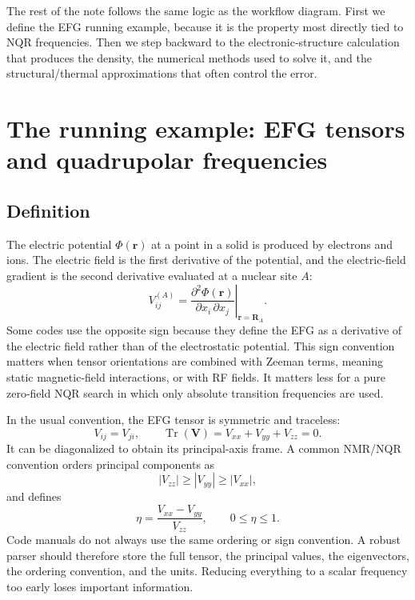 \documentclass[11pt]{article}
\newcommand{\etaEFG}{\eta}
\newcommand{\Tr}{\operatorname{Tr}}
\begin{document}
The rest of the note follows the same logic as the workflow diagram.  First we define the EFG running example, because it is the property most directly tied to NQR frequencies.  Then we step backward to the electronic-structure calculation that produces the density, the numerical methods used to solve it, and the structural/thermal approximations that often control the error.

\section{The running example: EFG tensors and quadrupolar frequencies}

\subsection{Definition}

The electric potential $\Phi(\mathbf r)$ at a point in a solid is produced by electrons and ions.  The electric field is the first derivative of the potential, and the electric-field gradient is the second derivative evaluated at a nuclear site $A$:
\begin{equation}
V_{ij}^{(A)} = \left.\frac{\partial^2 \Phi(\mathbf r)}{\partial x_i\,\partial x_j}\right|_{\mathbf r=\mathbf R_A}.
\label{eq:efgdef}
\end{equation}
Some codes use the opposite sign because they define the EFG as a derivative of the electric field rather than of the electrostatic potential.  This sign convention matters when tensor orientations are combined with Zeeman terms, meaning static magnetic-field interactions, or with RF fields.  It matters less for a pure zero-field NQR search in which only absolute transition frequencies are used.

In the usual convention, the EFG tensor is symmetric and traceless:
\begin{equation}
V_{ij}=V_{ji}, \qquad \Tr(\mathbf V)=V_{xx}+V_{yy}+V_{zz}=0.
\end{equation}
It can be diagonalized to obtain its principal-axis frame.  A common NMR/NQR convention orders principal components as
\begin{equation}
|V_{zz}| \ge |V_{yy}| \ge |V_{xx}|,
\end{equation}
and defines
\begin{equation}
\etaEFG = \frac{V_{xx}-V_{yy}}{V_{zz}}, \qquad 0 \le \etaEFG \le 1 .
\label{eq:eta}
\end{equation}
Code manuals do not always use the same ordering or sign convention.  A robust parser should therefore store the full tensor, the principal values, the eigenvectors, the ordering convention, and the units.  Reducing everything to a scalar frequency too early loses important information.
\end{document}
